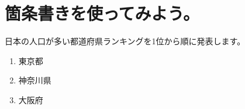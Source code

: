 \documentclass{ltjsarticle}
\begin{document}
\section{箇条書きを使ってみよう。}
日本の人口が多い都道府県ランキングを1位から順に発表します。
\begin{enumerate}
\item
東京都
\item
神奈川県
\item
大阪府
\end{enumerate}
\end{document}
